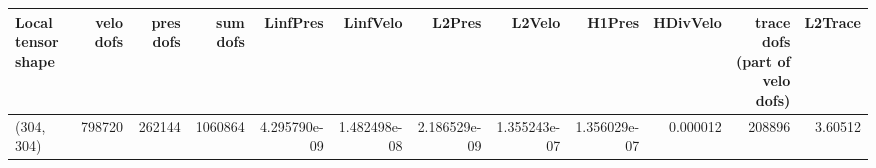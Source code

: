 \begin{tabular}{lrrrrrrrrrrr}
\toprule
Local tensor shape &  velo dofs &  pres dofs &  sum dofs &     LinfPres &     LinfVelo &       L2Pres &       L2Velo &       H1Pres &  HDivVelo &  trace dofs (part of velo dofs) &  L2Trace \\
\midrule
        (304, 304) &     798720 &     262144 &   1060864 & 4.295790e-09 & 1.482498e-08 & 2.186529e-09 & 1.355243e-07 & 1.356029e-07 &  0.000012 &                          208896 &  3.60512 \\
\bottomrule
\end{tabular}
